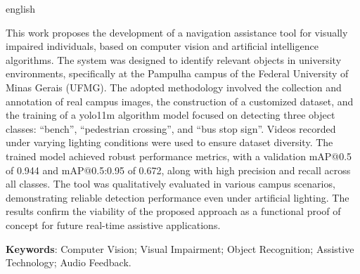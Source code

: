 \documentclass[
	12pt,				%
	openright,			%
	oneside,			%
	a4paper,			%
	english,			%
	french,				%
	spanish,			%
	brazil,				%
	]{abntex2}
\begin{document}
 \begin{resumo}[ABSTRACT]
  \begin{otherlanguage*}{english}

 \vspace{\onelineskip}
 
This work proposes the development of a navigation assistance tool for visually impaired individuals, based on computer vision and artificial intelligence algorithms. The system was designed to identify relevant objects in university environments, specifically at the Pampulha campus of the Federal University of Minas Gerais (UFMG). The adopted methodology involved the collection and annotation of real campus images, the construction of a customized dataset, and the training of a yolo11m algorithm model focused on detecting three object classes: “bench”, “pedestrian crossing”, and “bus stop sign”. Videos recorded under varying lighting conditions were used to ensure dataset diversity. The trained model achieved robust performance metrics, with a validation mAP@0.5 of 0.944 and mAP@0.5:0.95 of 0.672, along with high precision and recall across all classes. The tool was qualitatively evaluated in various campus scenarios, demonstrating reliable detection performance even under artificial lighting. The results confirm the viability of the proposed approach as a functional proof of concept for future real-time assistive applications.
 \vspace{\onelineskip}
    
 \noindent
    \textbf{Keywords}: Computer Vision; Visual Impairment; Object Recognition; Assistive Technology; Audio Feedback.
 \end{otherlanguage*}
 \end{resumo}

 \listoffigures*
 \cleardoublepage

 \listoftables*
 \cleardoublepage
\end{document}
